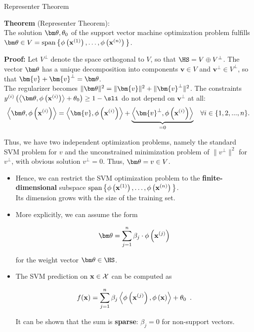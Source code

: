 \documentclass[11pt,compress,t,notes=noshow, xcolor=table]{beamer}
\begin{document}
\begin{vbframe}{Representer Theorem}

  \textbf{Theorem} (Representer Theorem):\\
  The solution $\thetav, \theta_0$ of the support vector machine optimization problem fulfills $\thetav \in V = \spn\big\{\phi\left(\xv^{(1)}\right), \dots, \phi\left(\xv^{(n)}\right)\big\}$.\\

  \vspace*{0.2cm}

  \begin{footnotesize}
  \textbf{Proof:} Let $V^\perp$ denote the space orthogonal to $V$,
  so that $\HS = V \oplus V^\perp$. The vector $\thetav$ has a
  unique decomposition into components $\bm{v} \in V$ and $\bm{v} ^\perp \in V^\perp$,
  so that $\bm{v}  + \bm{v} ^\perp = \thetav$.\\[0.5em]

  The regularizer becomes $\|\thetav\|^2 = \|\bm{v} \|^2 + \|\bm{v} ^\perp\|^2$.
  The constraints $\yi  \left( \scp{\thetav}{\phi\left(\xi\right)} + \theta_0\right) \geq 1 - \sli$
  do not depend on $\bm{v} ^\perp$ at all:
  $$
    \scp{\thetav}{\phi\left(\xi\right)} = \scp{\bm{v} }{\phi\left(\xi\right)} + \underbrace{\scp{\bm{v}^\perp}{\phi\left(\xi \right)}}_{= 0}
    \enspace ~ \forall i \in \{1, 2, ..., n\}.
  $$

  Thus, we have two independent optimization problems, namely the
  standard SVM problem for $v$ and the unconstrained minimization
  problem of $\|v^\perp\|^2$ for $v^\perp$, with obvious solution
  $v^\perp = 0$. Thus, $\thetav = v \in V$.
  \end{footnotesize}

  \framebreak

  \begin{itemize}
    \item Hence, we can restrict the SVM optimization problem
    to the \textbf{finite-dimensional} subspace
    $\operatorname{span}\big\{\phi\left(\mathbf{x}^{(1)}\right), \dots, \phi\left(\mathbf{x}^{(n)}\right)\big\}$.\\
    Its dimension grows with the size of the
    training set.
    \item More explicitly, we can assume the form
    \begin{footnotesize}
    $$ \thetav = \sum_{j=1}^n \beta_j \cdot \phi\left(\xv^{(j)}\right) $$
    \end{footnotesize}
    for the weight vector $\thetav\in \HS$.
      \item The SVM prediction on $\mathbf{x} \in \mathcal{X}$ can be computed as
    \begin{footnotesize}
    $$
    f(\mathbf{x}) = \sum_{j = 1}^n \beta_j \left\langle \phi\left(\mathbf{x}^{(j)}\right), \phi\left(\mathbf{x}\right) \right\rangle + \theta_0
    \enspace.
    $$
    \end{footnotesize}


    It can be shown that the sum is \textbf{sparse}: $\beta_j = 0$ for non-support vectors.

  \end{itemize}

\end{vbframe}

\endlecture
\end{document}
